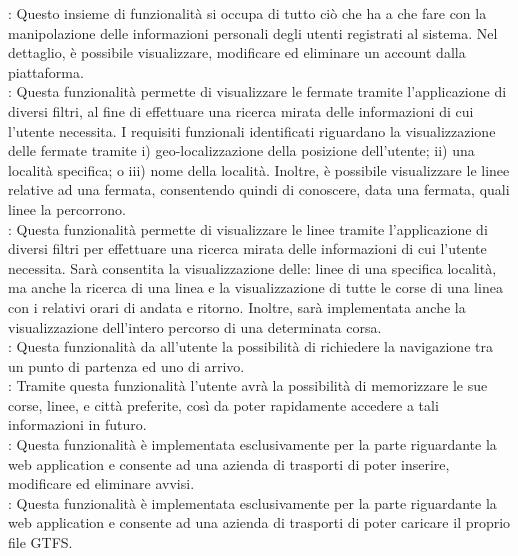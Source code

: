 : Questo insieme di funzionalit\`{a} si occupa di tutto ciò che ha a che fare con la manipolazione delle informazioni personali degli utenti registrati al sistema. Nel dettaglio, \`{e} possibile visualizzare, modificare ed eliminare un account dalla piattaforma.\\

: Questa funzionalit\`{a} permette di visualizzare le fermate tramite l’applicazione di diversi filtri, al fine di effettuare una ricerca mirata delle informazioni di cui l’utente necessita. I requisiti funzionali identificati riguardano la visualizzazione delle fermate tramite i) geo-localizzazione della posizione dell'utente; ii) una localit\`{a} specifica; o iii) nome della localit\`{a}. Inoltre, \`{e} possibile visualizzare le linee relative ad una fermata, consentendo quindi di conoscere, data una fermata, quali linee la percorrono.\\

: Questa funzionalit\`{a} permette di visualizzare le linee tramite l’applicazione di diversi filtri per effettuare una ricerca mirata delle informazioni di cui l’utente necessita. Sar\`{a} consentita la visualizzazione delle: linee di una specifica localit\`{a}, ma anche la ricerca di una linea e la visualizzazione di tutte le corse di una linea con i relativi orari di andata e ritorno. Inoltre, sar\`{a} implementata anche la visualizzazione dell'intero percorso di una determinata corsa.\\

: Questa funzionalit\`{a} da all'utente la possibilit\`{a} di richiedere la navigazione tra un punto di partenza ed uno di arrivo.\\

: Tramite questa funzionalit\`{a} l'utente avr\`{a} la possibilit\`{a} di memorizzare le sue corse, linee, e citt\`{a} preferite, cos\`{i} da poter rapidamente accedere a tali informazioni in futuro.\\

: Questa funzionalit\`{a} è implementata esclusivamente per la parte riguardante la web application e consente ad una azienda di trasporti di poter inserire, modificare ed eliminare avvisi.\\

: Questa funzionalit\`{a} è implementata esclusivamente per la parte riguardante la web application e consente ad una azienda di trasporti di poter caricare il proprio file GTFS.

